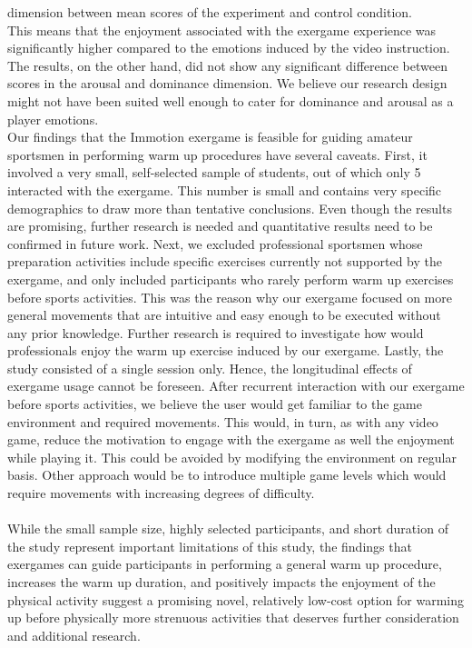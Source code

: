 dimension between mean scores of the experiment and control condition. \\This means that the enjoyment associated with the exergame experience was significantly higher compared to the emotions induced by the video instruction. The results, on the other hand, did not show any significant difference between scores in the arousal and dominance dimension. We believe our research design might not have been suited well enough to cater for dominance and arousal as a player emotions.\\
Our findings that the Immotion exergame is feasible for guiding amateur sportsmen in performing warm up procedures have several caveats. First, it involved a very small, self-selected sample of students, out of which only 5  interacted with the exergame. This number is small and contains very specific demographics to draw more than tentative conclusions. Even though the results are promising, further research is needed and quantitative results need to be confirmed in future work. Next, we excluded professional sportsmen whose preparation activities include specific exercises currently not supported by the exergame, and only included participants who rarely perform warm up exercises before sports activities. This was the reason why our exergame focused on more general movements that are intuitive and easy enough to be executed without any prior knowledge.  Further research is required to investigate how would professionals enjoy the warm up exercise induced by our exergame. Lastly, the study consisted of a single session only. Hence, the longitudinal effects of exergame usage cannot be foreseen. After recurrent interaction with our exergame before sports activities, we believe the user would get familiar to the game environment  and required movements. This would, in turn, as with any video game, reduce the motivation to  engage with the exergame as well the enjoyment while playing it. This could be avoided by modifying the environment on regular basis. Other approach would be to introduce multiple  game levels which would require movements with increasing degrees of difficulty.\\\\
While the small sample size, highly selected participants, and short duration of the study represent important limitations of this study, the findings that exergames can guide participants in performing a general warm up procedure, increases the warm up duration, and positively impacts the enjoyment of the physical activity suggest a promising novel, relatively low-cost option for warming up before physically more strenuous activities that deserves further consideration and additional research.

